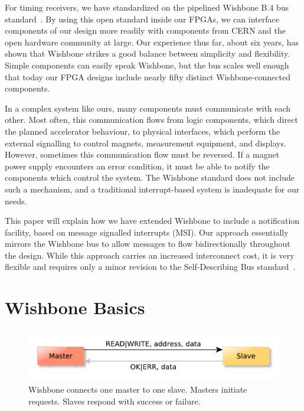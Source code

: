 \documentclass[a4paper]{jacow}
\begin{document}
For timing receivers, we have standardized on the pipelined Wishbone B.4 bus
standard~\cite{wb}.
By using this open standard inside our FPGAs, we can interface components of our design
more readily with components from CERN and the open hardware community at large.
Our experience thus far, about six years, has shown that
Wishbone strikes a good balance between simplicity and flexibility.
Simple components can easily speak Wishbone, 
but the bus scales well enough that today our FPGA designs include nearly fifty
distinct Wishbone-connected components.

In a complex system like ours, many components must communicate with each other.
Most often, this communication flows from logic components, which direct the
planned accelerator behaviour, to physical interfaces, which perform the
external signalling to control magnets, measurement equipment, and displays.
However, sometimes this communication flow must be reversed.
If a magnet power supply encounters an error condition, 
it must be able to notify the components which control the system.
The Wishbone standard does not include such a mechanism,
and a traditional interrupt-based system is inadequate for our needs.

This paper will explain how we have extended Wishbone to include a
notification facility, based on message signalled interrupts (MSI).
Our approach essentially mirrors the Wishbone bus to allow messages to flow
bidirectionally throughout the design.
While this approach carries an increased interconnect cost, 
it is very flexible and requires only a minor revision to the
Self-Describing Bus standard~\cite{sdb}.

\section{Wishbone Basics}

\begin{figure}[t]
  \centering
  \includegraphics*[width=\columnwidth]{wb-ptp}
  \caption{Wishbone connects one master to one slave. 
  Masters initiate requests. Slaves respond with
  success or failure.}
  \label{fig:wb-ptp}
\end{figure}
\end{document}
